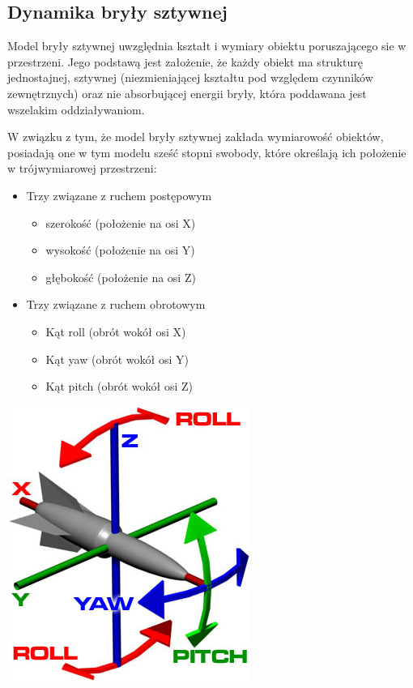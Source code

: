 \subsection{Dynamika bryły sztywnej}
\par{
Model bryły sztywnej uwzględnia kształt i wymiary obiektu poruszającego sie w przestrzeni. Jego podstawą jest założenie, że każdy obiekt ma strukturę jednostajnej, sztywnej (niezmieniającej kształtu pod względem czynników zewnętrznych) oraz nie absorbującej energii bryły, która poddawana jest wszelakim oddziaływaniom.
}
\par{
W związku z tym, że model bryły sztywnej zakłada wymiarowość obiektów, posiadają one w tym modelu sześć stopni swobody, które określają ich położenie w trójwymiarowej przestrzeni:
\begin{itemize}
\item Trzy związane z ruchem postępowym
	\begin{itemize}
	\item szerokość (położenie na osi X)
	\item wysokość (położenie na osi Y)
	\item głębokość (położenie na osi Z)
	\end{itemize}
\item Trzy związane z ruchem obrotowym
	\begin{itemize}
	\item Kąt roll (obrót wokół osi X)
	\item Kąt yaw (obrót wokół osi Y)
	\item Kąt pitch (obrót wokół osi Z)
	\end{itemize}
\end{itemize}
}
\par{
\begin{center}
\includegraphics[]{img/xyz_ryp}
\end{center}
}
